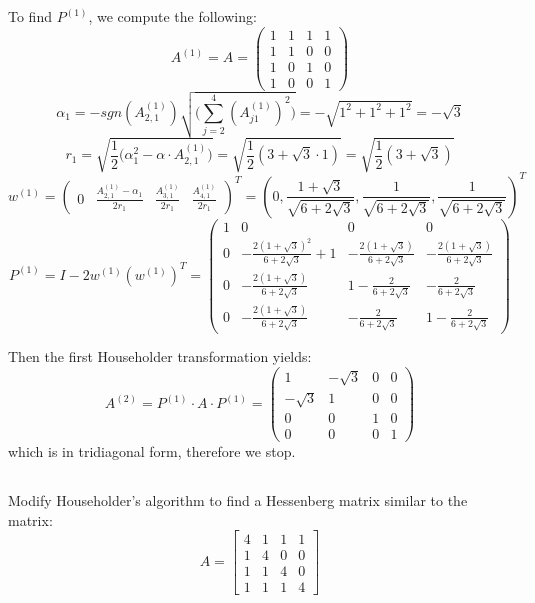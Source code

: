 \documentclass[12pt]{article} %
\newcommand{\1}[1]{\mathds{1}\left[#1\right]}
\begin{document}
To find $P^{(1)}$, we compute the following:
$$
	A^{(1)} = A = \begin{pmatrix}
		1 & 1 & 1 & 1 \\
		1 & 1 & 0 & 0 \\
		1 & 0 & 1 & 0 \\
		1 & 0 & 0 & 1
	\end{pmatrix}
$$
$$
	\alpha_1 = -sgn(A_{2,1}^{(1)})\sqrt{\bigg(
	\sum_{j=2}^{4}(A_{j1}^{(1)})^2
	\bigg)} = 
	-\sqrt{1^2 +1^2 + 1^2} = -\sqrt{3}
$$ 
$$
	r_1 = \sqrt{\frac{1}{2}\bigg(
	\alpha_1^2 - \alpha\cdot A_{2,1}^{(1)}
	\bigg)} = \sqrt{\frac12(3 +\sqrt{3}\cdot 1)} = \sqrt{\frac12(3+\sqrt{3})}
$$
$$
	w^{(1)} = 
	\begin{pmatrix}
		0 &
		\frac{A_{2,1}^{(1)} - \alpha_1}{2r_1}&
		\frac{A_{3,1}^{(1)}}{2r_1}&
		\frac{A_{4,1}^{(1)}}{2r_1}
	\end{pmatrix}^T = 
	(0, \frac{1+\sqrt{3}}{\sqrt{6+2\sqrt{3}}}, \frac{1}{\sqrt{6+2\sqrt{3}}}, \frac{1}{\sqrt{6+2\sqrt{3}}})^T
$$
$$
	P^{(1)} = I-2w^{(1)}(w^{(1)})^T = 
	\begin{pmatrix}
		1 & 0 & 0 & 0 \\
		0 & -\frac{2(1+\sqrt{3})^2}{6+2\sqrt{3}}+1 & -\frac{2(1+\sqrt{3})}{6+2\sqrt{3}} & -\frac{2(1+\sqrt{3})}{6+2\sqrt{3}}\\
		0 & -\frac{2(1+\sqrt{3})}{6+2\sqrt{3}} & 1-\frac{2}{6+2\sqrt{3}} & -\frac{2}{6+2\sqrt{3}}\\
		0 & -\frac{2(1+\sqrt{3})}{6+2\sqrt{3}} & -\frac{2}{6+2\sqrt{3}} & 1 - \frac{2}{6+2\sqrt{3}}
	\end{pmatrix}
$$ 

Then the first Householder transformation yields:
$$
	A^{(2)} = P^{(1)}\cdot A\cdot P^{(1)} = 
	\begin{pmatrix}
		1 & -\sqrt{3} & 0 & 0 \\
		-\sqrt{3} & 1 & 0 & 0 \\
		0 & 0 & 1 & 0 \\
		0 & 0 & 0 & 1
	\end{pmatrix}
$$ which is in tridiagonal form, therefore we stop.


\subsection{}
Modify Householder's algorithm to find a Hessenberg matrix similar to the matrix:
$$
	A = 
\begin{bmatrix}
		4 & 1 & 1 & 1 \\
		1 & 4 & 0 & 0 \\
		1 & 1 & 4 & 0 \\
		1 & 1 & 1 & 4
	\end{bmatrix}
$$
\end{document}
